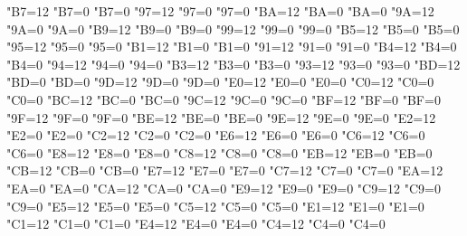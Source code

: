 {    \catcode"B7=12 \lccode"B7=0 \uccode"B7=0 %
    \catcode"97=12 \lccode"97=0 \uccode"97=0 %
    \catcode"BA=12 \lccode"BA=0 \uccode"BA=0 %
    \catcode"9A=12 \lccode"9A=0 \uccode"9A=0 %
    \catcode"B9=12 \lccode"B9=0 \uccode"B9=0 %
    \catcode"99=12 \lccode"99=0 \uccode"99=0 %
    \catcode"B5=12 \lccode"B5=0 \uccode"B5=0 %
    \catcode"95=12 \lccode"95=0 \uccode"95=0 %
    \catcode"B1=12 \lccode"B1=0 \uccode"B1=0 %
    \catcode"91=12 \lccode"91=0 \uccode"91=0 %
    \catcode"B4=12 \lccode"B4=0 \uccode"B4=0 %
    \catcode"94=12 \lccode"94=0 \uccode"94=0 %
    \catcode"B3=12 \lccode"B3=0 \uccode"B3=0 %
    \catcode"93=12 \lccode"93=0 \uccode"93=0 %
    \catcode"BD=12 \lccode"BD=0 \uccode"BD=0 %
    \catcode"9D=12 \lccode"9D=0 \uccode"9D=0 %
    \catcode"E0=12 \lccode"E0=0 \uccode"E0=0 %
    \catcode"C0=12 \lccode"C0=0 \uccode"C0=0 %
    \catcode"BC=12 \lccode"BC=0 \uccode"BC=0 %
    \catcode"9C=12 \lccode"9C=0 \uccode"9C=0 %
    \catcode"BF=12 \lccode"BF=0 \uccode"BF=0 %
    \catcode"9F=12 \lccode"9F=0 \uccode"9F=0 %
    \catcode"BE=12 \lccode"BE=0 \uccode"BE=0 %
    \catcode"9E=12 \lccode"9E=0 \uccode"9E=0 %
    \catcode"E2=12 \lccode"E2=0 \uccode"E2=0 %
    \catcode"C2=12 \lccode"C2=0 \uccode"C2=0 %
    \catcode"E6=12 \lccode"E6=0 \uccode"E6=0 %
    \catcode"C6=12 \lccode"C6=0 \uccode"C6=0 %
    \catcode"E8=12 \lccode"E8=0 \uccode"E8=0 %
    \catcode"C8=12 \lccode"C8=0 \uccode"C8=0 %
    \catcode"EB=12 \lccode"EB=0 \uccode"EB=0 %
    \catcode"CB=12 \lccode"CB=0 \uccode"CB=0 %
    \catcode"E7=12 \lccode"E7=0 \uccode"E7=0 %
    \catcode"C7=12 \lccode"C7=0 \uccode"C7=0 %
    \catcode"EA=12 \lccode"EA=0 \uccode"EA=0 %
    \catcode"CA=12 \lccode"CA=0 \uccode"CA=0 %
    \catcode"E9=12 \lccode"E9=0 \uccode"E9=0 %
    \catcode"C9=12 \lccode"C9=0 \uccode"C9=0 %
    \catcode"E5=12 \lccode"E5=0 \uccode"E5=0 %
    \catcode"C5=12 \lccode"C5=0 \uccode"C5=0 %
    \catcode"E1=12 \lccode"E1=0 \uccode"E1=0 %
    \catcode"C1=12 \lccode"C1=0 \uccode"C1=0 %
    \catcode"E4=12 \lccode"E4=0 \uccode"E4=0 %
    \catcode"C4=12 \lccode"C4=0 \uccode"C4=0 %
}
